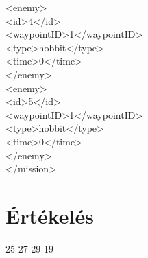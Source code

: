 \phantom{pina}<enemy>\\
\phantom{pina}\phantom{pina}<id>4</id>\\
\phantom{pina}\phantom{pina}<waypointID>1</waypointID>\\
\phantom{pina}\phantom{pina}<type>hobbit</type>\\
\phantom{pina}\phantom{pina}<time>0</time>\\
\phantom{pina}</enemy>\\
\phantom{pina}<enemy>\\
\phantom{pina}\phantom{pina}<id>5</id>\\
\phantom{pina}\phantom{pina}<waypointID>1</waypointID>\\
\phantom{pina}\phantom{pina}<type>hobbit</type>\\
\phantom{pina}\phantom{pina}<time>0</time>\\
\phantom{pina}</enemy>\\
</mission>\\
\section{Értékelés}

\begin{ertekeles}
{25}        %
{27}
{29}
{19}
\end{ertekeles}

